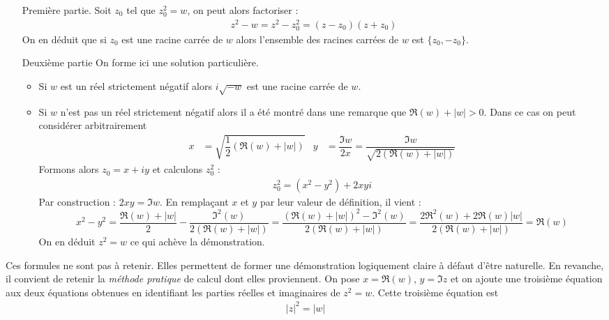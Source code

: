 \begin{demo}
 \begin{itemize}
 \item[Première partie.] Soit $z_0$ tel que $z_0^2=w$, on peut alors factoriser :
\begin{align*}
 z^2 - w = z^2 - z_0^2 = (z-z_0)(z+z_0)
\end{align*}
 On en déduit que si $z_0$ est une racine carrée de $w$ alors l'ensemble des racines carrées de $w$ est $\{z_0,-z_0\}$.
\item[Deuxième partie] On forme ici une solution particulière.
\begin{itemize}
\item Si $w$ est un réel strictement négatif alors $i\sqrt{-w}$ est une racine carrée de $w$.
\item Si $w$ n'est pas un réel strictement négatif alors il a été montré dans une remarque que $\Re(w) + |w| >0$. Dans ce cas on peut considérer arbitrairement
\begin{align*}
 x&=\sqrt{\dfrac{1}{2}(\Re(w) + |w|)}& y&=\dfrac{\Im w}{2x}= \dfrac{\Im w}{\sqrt{2(\Re(w) + |w|)}}
\end{align*}
Formons alors $z_0=x + iy$ et calculons $z_0^2$ :
\begin{align*}
 z_0^2 = (x^2 - y^2) + 2xyi
\end{align*}
Par construction : $2xy = \Im w$. En remplaçant $x$ et $y$ par leur valeur de définition, il vient :
\begin{displaymath}
 x^2 - y^2 = \frac{\Re(w) + |w|}{2} - \frac{\Im^2(w)}{2(\Re(w) + |w|)}
= \frac{(\Re(w) + |w|)^2 - \Im^2(w)}{2(\Re(w) + |w|)}
= \frac{2\Re^2(w) +  2\Re(w)|w|}{2(\Re(w) + |w|)} = \Re(w)
\end{displaymath}
On en déduit $z^2 = w$ ce qui achève la démonstration.
\end{itemize}
\end{itemize}
\end{demo}
Ces formules ne sont pas à retenir. Elles permettent de former une démonstration logiquement claire à défaut d'être naturelle. En revanche, il convient de retenir la \emph{méthode pratique} de calcul dont elles proviennent.\newline
On pose $x=\Re(w)$, $y=\Im z$ et on ajoute une troisième équation aux deux équations obtenues en identifiant les parties réelles et imaginaires de $z^2=w$. Cette troisième équation est
\begin{align*}
 |z|^2 = |w|
\end{align*}
